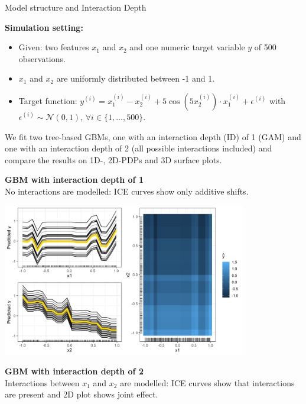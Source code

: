 \begin{vbframe}{Model structure and Interaction Depth}
\framebreak


\textbf{Simulation setting:}
\begin{itemize}
\item Given: two features $x_1$ and $x_2$ and one numeric target variable $y$ of 500 observations.
\item $x_1$ and $x_2$ are uniformly distributed between -1 and 1.
\item Target function: $y^{(i)} = x_1^{(i)} -  x_2^{(i)} + 5\cos(5 x_2^{(i)}) \cdot x_1^{(i)} + \epsilon^{(i)}$ with $\epsilon^{(i)} \sim \mathcal{N}(0, 1)$, $\forall i \in \{1, \dots, 500\}$.
\end{itemize} 
\vspace*{1cm}
We fit two tree-based GBMs, one with an interaction depth (ID) of 1 (GAM) and one with an interaction depth of 2 (all possible interactions included) and compare the results on 1D-, 2D-PDPs and 3D surface plots.

\framebreak

\textbf{GBM with interaction depth of 1}\\
No interactions are modelled: ICE curves show only additive shifts.

\begin{center}
\includegraphics[width=0.8\textwidth]{figure_man/boosting_interaction_example_gam.PNG}
\end{center}

\textbf{GBM with interaction depth of 2}\\
Interactions between $x_1$ and $x_2$ are modelled: ICE curves show that interactions are present and 2D plot shows joint effect.


\end{vbframe}
